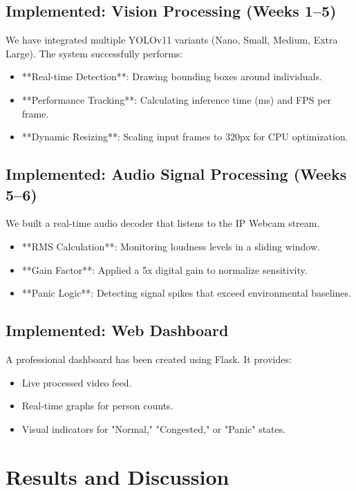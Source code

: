 \documentclass[12pt,oneside,a4paper]{book}
\begin{document}
\section{Implemented: Vision Processing (Weeks 1--5)}
We have integrated multiple YOLOv11 variants (Nano, Small, Medium, Extra Large). The system successfully performs:
\begin{itemize}
    \item **Real-time Detection**: Drawing bounding boxes around individuals.
    \item **Performance Tracking**: Calculating inference time (ms) and FPS per frame.
    \item **Dynamic Resizing**: Scaling input frames to 320px for CPU optimization.
\end{itemize}

\section{Implemented: Audio Signal Processing (Weeks 5--6)}
We built a real-time audio decoder that listens to the IP Webcam stream.
\begin{itemize}
    \item **RMS Calculation**: Monitoring loudness levels in a sliding window.
    \item **Gain Factor**: Applied a 5x digital gain to normalize sensitivity.
    \item **Panic Logic**: Detecting signal spikes that exceed environmental baselines.
\end{itemize}

\section{Implemented: Web Dashboard}
A professional dashboard has been created using Flask. It provides:
\begin{itemize}
    \item Live processed video feed.
    \item Real-time graphs for person counts.
    \item Visual indicators for "Normal," "Congested," or "Panic" states.
\end{itemize}

\chapter{Results and Discussion}
\end{document}
